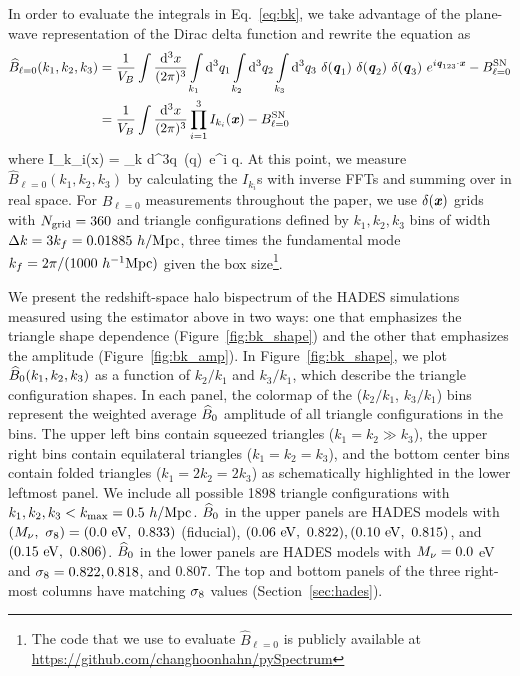 In order to evaluate the integrals in Eq.~\ref{eq:bk}, we take advantage of the plane-wave 
representation of the Dirac delta function and rewrite the equation as
\begin{align} \label{eq:bk2} 
    \widehat{B}_{\ell = 0}(k_1,k_2, k_3) &= \frac{1}{V_B} \int\frac{{\rm d}^3x}{(2\pi)^3} \int\limits_{k_1}{\rm d}^3q_1 \int\limits_{k_2}{\rm d}^3q_2 \int\limits_{k_3}{\rm d}^3q_3~\delta({\textbf{\textit{q}}_1})~\delta({\textbf{\textit{q}}_2})~\delta({\textbf{\textit{q}}_3})~e^{i{\textbf{\textit{q}}_{123}}\cdot{\textbf{\textit{x}}}} - B^{\rm SN}_{\ell = 0}\\ 
    &= \frac{1}{V_B} \int\frac{{\rm d}^3x}{(2\pi)^3}\prod\limits_{i=1}^{3} I_{k_i}({\textbf{\textit{x}}}) - B^{\rm SN}_{\ell = 0} 
\end{align}
where 
\beq
I_{k_i}({\bfi x}) = \int\limits_k {\rm d}^3q~\delta({\bfi q})~e^{i {\bfi q}}. 
\eeq
At this point, we measure $\widehat{B}_{\ell = 0}(k_1, k_2, k_3)$ by calculating the 
$I_{k_i}$s with inverse FFTs and summing over in real space. For $\widehat{B}_{\ell = 0}$
measurements throughout the paper, we use $\delta({\textbf{\textit{x}}})$ grids with $N_{\rm grid} = 360$ 
and triangle configurations defined by $k_1, k_2, k_3$ bins of width 
$\Delta k = 3 k_f = 0.01885~h/{\rm Mpc}$, three times the fundamental mode
$k_f = 2\pi/(1000~h^{-1}{\rm Mpc})$ given the box size\footnote{The code that we use to 
evaluate $\widehat{B}_{\ell = 0}$ is publicly available at \url{https://github.com/changhoonhahn/pySpectrum}}. 

We present the redshift-space halo bispectrum of the HADES simulations measured using 
the estimator above in two ways: one that emphasizes the triangle shape dependence 
(Figure~\ref{fig:bk_shape}) and the other that emphasizes the amplitude 
(Figure~\ref{fig:bk_amp}). In Figure~\ref{fig:bk_shape}, we plot $\widehat{B}_0(k_1, k_2, k_3)$ 
as a function of $k_2/k_1$ and $k_3/k_1$, which describe the triangle configuration shapes. 
In each panel, the colormap of the ($k_2/k_1$, $k_3/k_1$) bins represent the weighted 
average $\widehat{B}_0$ amplitude of all triangle configurations in the bins. The upper left 
bins contain squeezed triangles ($k_1 = k_2 \gg k_3$), the upper right bins contain 
equilateral triangles ($k_1 = k_2 = k_3$), and the bottom center bins contain folded 
triangles ($k_1 = 2 k_2 = 2 k_3$) as schematically highlighted in the lower leftmost panel. 
We include all possible 1898 triangle configurations with $k_1, k_2, k_3 < k_{\rm max} = 0.5~h/{\rm Mpc}$. 
$\widehat{B}_0$ in the upper panels are HADES models with 
$(M_\nu,~\sigma_8) = (0.0~{\rm eV},~0.833)$ (fiducial), $(0.06~{\rm eV},~0.822), (0.10~{\rm eV},~0.815)$, 
and $(0.15~{\rm eV},~0.806)$. $\widehat{B}_0$ in the lower panels are  HADES models with $M_\nu = 0.0$ eV and 
$\sigma_8 = 0.822, 0.818$, and $0.807$. The top and bottom panels of the three right-most 
columns have matching $\sigma_8$ values (Section~\ref{sec:hades}).

